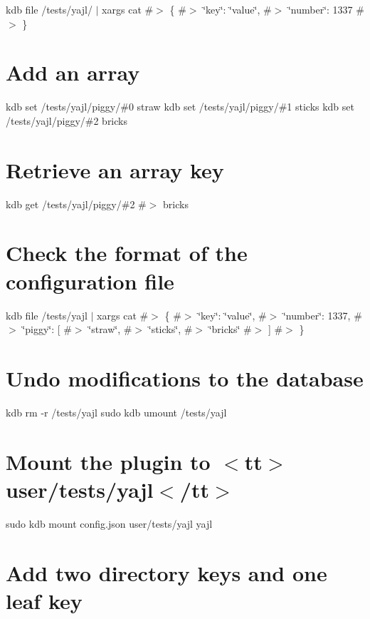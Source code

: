 kdb file /tests/yajl/ $\vert$ xargs cat \#$>$ \{ \#$>$ \char`\"{}key\char`\"{}\+: \char`\"{}value\char`\"{}, \#$>$ \char`\"{}number\char`\"{}\+: 1337 \#$>$ \}\hypertarget{autotoc_md726_autotoc_md740}{}\section{Add an array}\label{autotoc_md726_autotoc_md740}
kdb set /tests/yajl/piggy/\#0 straw kdb set /tests/yajl/piggy/\#1 sticks kdb set /tests/yajl/piggy/\#2 bricks\hypertarget{autotoc_md726_autotoc_md741}{}\section{Retrieve an array key}\label{autotoc_md726_autotoc_md741}
kdb get /tests/yajl/piggy/\#2 \#$>$ bricks\hypertarget{autotoc_md726_autotoc_md742}{}\section{Check the format of the configuration file}\label{autotoc_md726_autotoc_md742}
kdb file /tests/yajl $\vert$ xargs cat \#$>$ \{ \#$>$ \char`\"{}key\char`\"{}\+: \char`\"{}value\char`\"{}, \#$>$ \char`\"{}number\char`\"{}\+: 1337, \#$>$ \char`\"{}piggy\char`\"{}\+: \mbox{[} \#$>$ \char`\"{}straw\char`\"{}, \#$>$ \char`\"{}sticks\char`\"{}, \#$>$ \char`\"{}bricks\char`\"{} \#$>$ \mbox{]} \#$>$ \}\hypertarget{autotoc_md726_autotoc_md743}{}\section{Undo modifications to the database}\label{autotoc_md726_autotoc_md743}
kdb rm -\/r /tests/yajl sudo kdb umount /tests/yajl 
\begin{DoxyCode}{0}
\DoxyCodeLine{}
\end{DoxyCode}
 \hypertarget{autotoc_md726_autotoc_md744}{}\section{Mount the plugin to $<$tt$>$user/tests/yajl$<$/tt$>$}\label{autotoc_md726_autotoc_md744}
sudo kdb mount config.\+json user/tests/yajl yajl\hypertarget{autotoc_md726_autotoc_md745}{}\section{Add two directory keys and one leaf key}\label{autotoc_md726_autotoc_md745}
